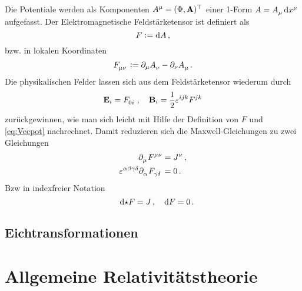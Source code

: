 Die Potentiale werden als Komponenten
$\tensor{A}{^\mu}=(\Phi,\vec{A})\transpose$ einer 1-Form
$A=\tensor{A}{_\mu}\dif\tensor{x}{^\mu}$ aufgefasst. Der Elektromagnetische Feldstärketensor ist definiert als
\begin{equation}
F:=\dif
A\,,
\end{equation}
bzw. in lokalen Koordinaten
\begin{equation}
\tensor{F}{_\mu_\nu}:=\partial_\mu\tensor{A}{_\nu}-\partial_\nu\tensor{A}{_\mu}\,.
\end{equation}
Die physikalischen Felder lassen sich aus dem Feldstärketensor wiederum durch 
\begin{equation}
\vec{E}_{i}=\tensor{F}{_0_i}\,,\quad
\vec{B}_i=\frac{1}{2}\tensor{\varepsilon}{^i^j^k}\tensor{F}{^j^k}
\end{equation}
zurückgewinnen, wie man sich leicht mit Hilfe der Definition von $F$ und
\eqref{eq:Vecpot} nachrechnet.
Damit reduzieren sich die Maxwell-Gleichungen zu zwei
Gleichungen
\begin{align}
\pdif{_\mu}\tensor{F}{^\mu^\nu}&=\tensor{J}{^\nu}
\label{eq:MaxwellInhom}\,,\\
\tensor{\varepsilon}{^\alpha^\beta^\gamma^\delta}
\pdif{_{\alpha}}\tensor{F}{_\gamma_{\delta}}&=0\,.
\label{eq:MaxwellHom}
\end{align}
Bzw in indexfreier Notation
\begin{equation}
\quad \dif\star F= J\,,\quad\dif F = 0\,.
\end{equation}
\subsection{Eichtransformationen}
\section{Allgemeine Relativitätstheorie}
